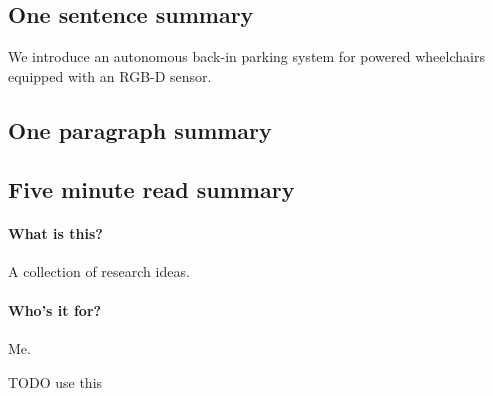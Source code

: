 \subsection{One sentence summary}
We introduce an autonomous back-in parking system for powered wheelchairs
equipped with an RGB-D sensor.

\subsection{One paragraph summary}

\subsection{Five minute read summary}

\paragraph{What is this?} A collection of research ideas.

\paragraph{Who's it for?} Me.

TODO use this \cite{viswanathan2011navigation}
